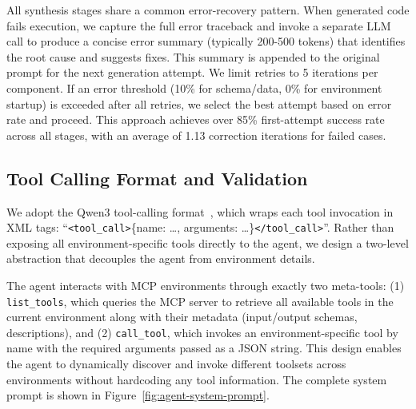 All synthesis stages share a common error-recovery pattern.
When generated code fails execution, we capture the full error traceback and invoke a separate LLM call to produce a concise error summary (typically 200-500 tokens) that identifies the root cause and suggests fixes.
This summary is appended to the original prompt for the next generation attempt.
We limit retries to 5 iterations per component.
If an error threshold (10\% for schema/data, 0\% for environment startup) is exceeded after all retries, we select the best attempt based on error rate and proceed.
This approach achieves over 85\% first-attempt success rate across all stages, with an average of 1.13 correction iterations for failed cases.


\subsection{Tool Calling Format and Validation} \label{appendix:tool_call_format}

We adopt the Qwen3 tool-calling format~\citep{qwen3}, which wraps each tool invocation in XML tags: ``\texttt{<tool\_call>}\{name: \dots, arguments: \dots\}\texttt{</tool\_call>}''.
Rather than exposing all environment-specific tools directly to the agent, we design a two-level abstraction that decouples the agent from environment details.

The agent interacts with MCP environments through exactly two meta-tools:
(1) \texttt{list\_tools}, which queries the MCP server to retrieve all available tools in the current environment along with their metadata (input/output schemas, descriptions), and
(2) \texttt{call\_tool}, which invokes an environment-specific tool by name with the required arguments passed as a JSON string.
This design enables the agent to dynamically discover and invoke different toolsets across environments without hardcoding any tool information.
The complete system prompt is shown in Figure~\ref{fig:agent-system-prompt}.

